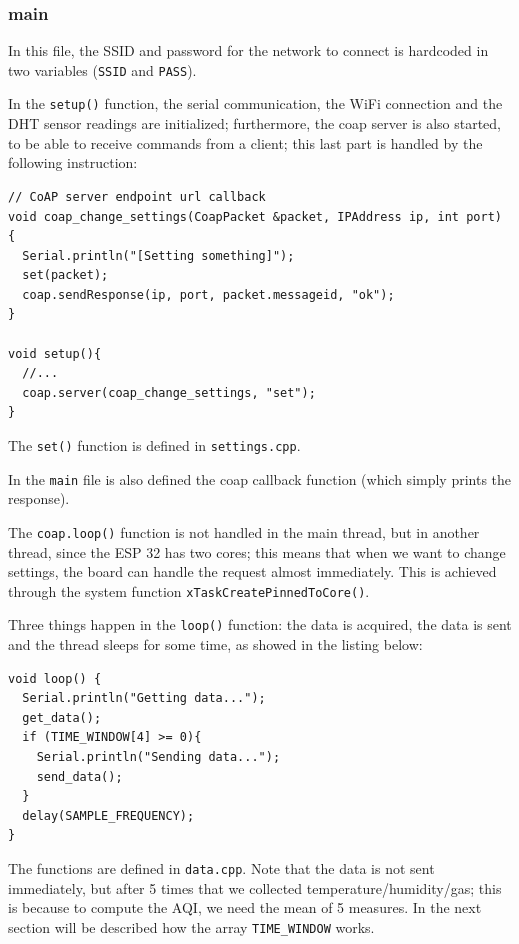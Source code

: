 \documentclass[]{article}
\begin{document}
\subsubsection{main}
In this file, the SSID and password for the network to connect is hardcoded in two variables (\texttt{SSID} and \texttt{PASS}). 

In the \texttt{setup()} function, the serial communication, the WiFi connection and the DHT sensor readings are initialized; furthermore, the coap server is also started, to be able to receive commands from a client; this last part is handled by the following instruction:

\begin{lstlisting}[style=C++, caption=Coap server]
// CoAP server endpoint url callback
void coap_change_settings(CoapPacket &packet, IPAddress ip, int port) {
  Serial.println("[Setting something]");
  set(packet);		
  coap.sendResponse(ip, port, packet.messageid, "ok");
}

void setup(){
  //...
  coap.server(coap_change_settings, "set");
}
\end{lstlisting}

The \texttt{set()} function is defined in \texttt{settings.cpp}.

In the \texttt{main} file is also defined the coap callback function (which simply prints the response).

The \texttt{coap.loop()} function is not handled in the main thread, but in another thread, since the ESP 32 has two cores; this means that when we want to change settings, the board can handle the request almost immediately. This is achieved through the system function \texttt{xTaskCreatePinnedToCore()}.

Three things happen in the \texttt{loop()} function: the data is acquired, the data is sent and the thread sleeps for some time, as showed in the listing below:

\begin{lstlisting}[style=C++, caption=Loop function]
void loop() {		
  Serial.println("Getting data...");
  get_data();
  if (TIME_WINDOW[4] >= 0){
    Serial.println("Sending data...");
    send_data();
  }
  delay(SAMPLE_FREQUENCY);	
}
\end{lstlisting}

The functions are defined in \texttt{data.cpp}. Note that the data is not sent immediately, but after 5 times that we collected temperature/humidity/gas; this is because to compute the AQI, we need the mean of 5 measures. In the next section will be described how the array \texttt{TIME\_WINDOW} works.
\end{document}
